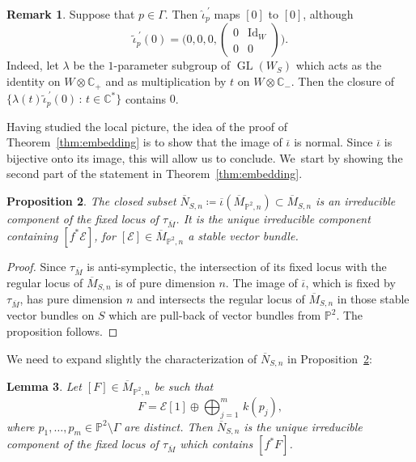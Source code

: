 \documentclass[JEP,XML,SOM,Unicode,published]{cedram}
\newcommand{\CC}{{\mathbb C}}\let\C\CC
\newcommand{\PP}{{\mathbb P}}\let\P\PP
\newcommand\cE{\mathcal{E}}
\DeclareMathOperator{\GL}{GL}
\DeclareMathOperator{\Id}{Id}
\let\ov\overline
\newtheorem{lemm}{Lemma}[section]
\newtheorem{prop}[lemm]{Proposition}
\theoremstyle{definition}
\newtheorem{rema}[lemm]{Remark}
\begin{document}
\begin{rema}\label{rmk:0Case2}
Suppose that $p\in\Gamma$.
Then
$\widehat{\iota}_p^{\ \prime}$ maps $[0]$ to $[0]$, although
\[
\widetilde{\iota}_p^{\ \prime}(0)=\biggl(0,0,0,\begin{pmatrix}0&\Id_W\\ 0&0\end{pmatrix}\biggr).
\]
Indeed, let $\lambda$ be the $1$-parameter subgroup of $\GL(W_S)$ which acts as the identity on $W\otimes\CC_{+}$ and as multiplication by $t$ on $W\otimes\CC_{-}$.
Then the closure of $\{\lambda(t)\widetilde{\iota}_p^{\ \prime}(0) \,:\, t\in \CC^{*}\}$ contains $0$.
\end{rema}

Having studied the local picture, the idea of the proof of Theorem~\ref{thm:embedding} is to show that the image of $\overline{\iota}$ is normal. Since $\overline{\iota}$ is bijective onto its image, this will allow us to conclude. We~start by showing the second part of the statement in Theorem~\ref{thm:embedding}.

\begin{prop}\label{prop:irrcmpfix}
The closed subset $\overline{N}_{S,n}\coloneqq\overline{\iota}(\overline{M}_{\PP^2,n})\subset\ov{M}_{S,n}$ is an irreducible component of the fixed locus of $\tau_{\overline{M}}$.
It is the unique irreducible component containing $[f^*\cE]$, for $[\cE]\in\overline{M}_{\PP^2,n}$ a stable vector bundle.
\end{prop}

\begin{proof}
Since $\tau_{\overline{M}}$ is anti-symplectic, the intersection of its fixed locus with the regular locus of $\overline{M}_{S,n}$ is of pure dimension $n$.
The image of $\overline{\iota}$, which is fixed by~$\tau_{\overline{M}}$, has pure dimension $n$ and intersects the regular locus of $\overline{M}_{S,n}$ in those stable vector bundles on $S$ which are pull-back of vector bundles from $\PP^2$.
The proposition follows.
\end{proof}

We need to expand slightly the characterization of $\ov{N}_{S,n}$ in Proposition~\ref{prop:irrcmpfix}:

\begin{lemm}\label{lem:UniqueFixedComponent}
Let $[F]\in\overline{M}_{\PP^2,n}$ be such that\vspace*{-3pt}
\[
F=\cE[1]\oplus \bigoplus_{j=1}^m\, k(p_j),
\]
where $p_1,\dots,p_m\in \PP^2\setminus\mathsf{\Gamma}$
are distinct. Then $\overline{N}_{S,n}$ is the unique irreducible component of the fixed locus of $\tau_{\overline{M}}$ which contains $[f^*F]$.
\end{lemm}
\end{document}
